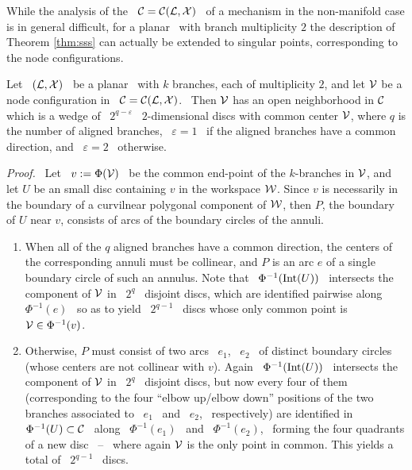 {} \label{csingc}

While the analysis of the \cspace \ $\mathcal{C}=\mathcal{C}(\mathcal{L},\mathcal{X})$ \ of a
mechanism in the non-manifold case is in general difficult, for a
planar \smech\ with branch multiplicity $2$ the description of
Theorem \ref{thm:sss} can actually be extended to singular points,
corresponding to the node configurations.

\begin{prop}\label{prop:2node}
%
Let \ $(\mathcal{L},\mathcal{X})$  \ be a planar \smech\ with $k$ branches, each
of multiplicity $2$,  and let $\mathcal{V}$ be a node configuration in \
$\mathcal{C}=\mathcal{C}(\mathcal{L},\mathcal{X})$. \ Then $\mathcal{V}$ has an open neighborhood in $\mathcal{C}$
which is a wedge of  \ $2^{q-\varepsilon}$ \ $2$-dimensional discs
with common center $\mathcal{V}$, where $q$ is the number of aligned
branches, \ $\varepsilon=1$ \ if the aligned branches have a
common direction, and \ $\varepsilon=2$ \ otherwise.

\end{prop}

\noindent\emph{Proof.} \ Let \ $v:=\Phi(\mathcal{V})$ \ be the common
end-point of the $k$-branches in $\mathcal{V}$, and let $U$ be an small
disc containing $v$ in the workspace $\mathcal{W}$. Since $v$ is
necessarily in the boundary of a curvilnear polygonal component of
$\mathcal{W}$, then $P$, the boundary of $U$ near $v$, consists of arcs of
the boundary circles of the annuli.

\begin{enumerate}
\item When all of the $q$ aligned branches have a common
direction, the centers of the corresponding annuli must be
collinear, and $P$ is an arc $e$ of a single boundary circle of
such an annulus. Note that \ $\Phi^{-1}(\operatorname{Int}(U))$ \ intersects the
component of $\mathcal{V}$ in \ $2^{q}$ \ disjoint discs, which are
identified pairwise along \ $\Phi^{-1}(e)$ \ so as to yield \
$2^{q-1}$ \ discs whose only common point is \
$\mathcal{V}\in\Phi^{-1}(v)$.

\item Otherwise, $P$ must consist of two arcs \ $e_{1}$, \ $e_{2}$
\ of distinct boundary circles (whose centers are not collinear
with $v$). Again \ $\Phi^{-1}(\operatorname{Int}(U))$ \ intersects the component
of $\mathcal{V}$ in \ $2^{q}$ \ disjoint discs, but now every four of them
(corresponding to the four ``elbow up/elbow down'' positions of
the two branches associated to \ $e_{1}$ \ and \ $e_{2}$, \
respectively) are identified in \ $\Phi^{-1}(U)\subset\mathcal{C}$ \ along
\ $\Phi^{-1}(e_{1})$ \ and \ $\Phi^{-1}(e_{2})$, \ forming the
four quadrants of a new disc \ -- \ where again $\mathcal{V}$ is the only
point in common. This yields a total of \ $2^{q-1}$ \ discs.\eee

\end{enumerate}
